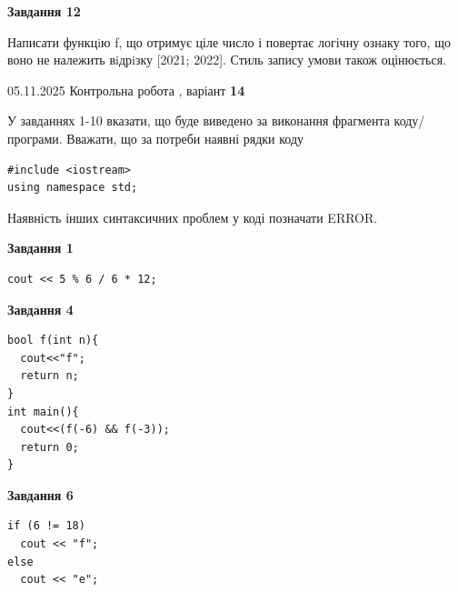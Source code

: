 \documentclass[12pt, ukrainian]{article}
\begin{document}
{\begin {large}
\begin{minipage}[t]{11.0cm}
\begin{center}
\textbf{Завдання 12}
\end{center}

Написати функцiю f, що отримує ціле число і повертає логічну ознаку того, що воно не належить вiдрiзку [2021; 2022]. Стиль запису умови також оцінюється.\par

\end{minipage}

\end {large}}
\newpage

{\Large{05.11.2025 Контрольна робота , варіант  \No \textbf { 14 }\par}}
{
\begin {large}
У завданнях 1-10 вказати, що буде виведено за виконання фрагмента коду/про\-гра\-ми.
Вважати, що за потреби наявні рядки коду
\begin{verbatim}
#include <iostream>
using namespace std;
\end{verbatim}
Наявність інших синтаксичних проблем у коді позначати ERROR.

\begin{minipage}[t]{7.0cm}

\begin{center}
\textbf{Завдання 1}
\end{center}
\vspace{-8mm}

\begin{verbatim}
cout << 5 % 6 / 6 * 12;
\end{verbatim}



\begin{center}
\textbf{Завдання 4}
\end{center}
\vspace{-8mm}

\begin{verbatim}
bool f(int n){
  cout<<"f";
  return n;
}
int main(){
  cout<<(f(-6) && f(-3));
  return 0;
}
\end{verbatim}



\begin{center}
\textbf{Завдання 6}
\end{center}
\vspace{-8mm}

\begin{verbatim}
if (6 != 18)
  cout << "f";
else
  cout << "e";
\end{verbatim}




\end{minipage}
\end{large}}
\end{document}
